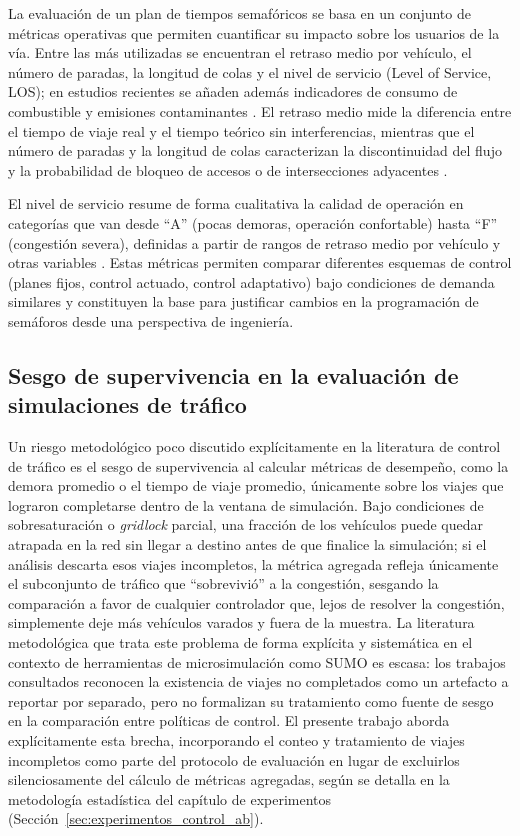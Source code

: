 La evaluación de un plan de tiempos semafóricos se basa en un conjunto de métricas operativas que permiten cuantificar su impacto sobre los usuarios de la vía. Entre las más utilizadas se encuentran el retraso medio por vehículo, el número de paradas, la longitud de colas y el nivel de servicio (Level of Service, LOS); en estudios recientes se añaden además indicadores de consumo de combustible y emisiones contaminantes \cite{garber2019traffic,roess2019traffic,papageorgiou2003review}. El retraso medio mide la diferencia entre el tiempo de viaje real y el tiempo teórico sin interferencias, mientras que el número de paradas y la longitud de colas caracterizan la discontinuidad del flujo y la probabilidad de bloqueo de accesos o de intersecciones adyacentes \cite{garber2019traffic,fhwa2008signal}.

El nivel de servicio resume de forma cualitativa la calidad de operación en categorías que van desde ``A'' (pocas demoras, operación confortable) hasta ``F'' (congestión severa), definidas a partir de rangos de retraso medio por vehículo y otras variables \cite{roess2019traffic,fhwa2008signal}. Estas métricas permiten comparar diferentes esquemas de control (planes fijos, control actuado, control adaptativo) bajo condiciones de demanda similares y constituyen la base para justificar cambios en la programación de semáforos desde una perspectiva de ingeniería.

\subsection{Sesgo de supervivencia en la evaluación de simulaciones de tráfico}
\label{subsec:sesgo_supervivencia}

Un riesgo metodológico poco discutido explícitamente en la literatura de control de tráfico es el sesgo de supervivencia al calcular métricas de desempeño, como la demora promedio o el tiempo de viaje promedio, únicamente sobre los viajes que lograron completarse dentro de la ventana de simulación. Bajo condiciones de sobresaturación o \emph{gridlock} parcial, una fracción de los vehículos puede quedar atrapada en la red sin llegar a destino antes de que finalice la simulación; si el análisis descarta esos viajes incompletos, la métrica agregada refleja únicamente el subconjunto de tráfico que ``sobrevivió'' a la congestión, sesgando la comparación a favor de cualquier controlador que, lejos de resolver la congestión, simplemente deje más vehículos varados y fuera de la muestra. La literatura metodológica que trata este problema de forma explícita y sistemática en el contexto de herramientas de microsimulación como SUMO \cite{lopez2018microscopic} es escasa: los trabajos consultados reconocen la existencia de viajes no completados como un artefacto a reportar por separado, pero no formalizan su tratamiento como fuente de sesgo en la comparación entre políticas de control. El presente trabajo aborda explícitamente esta brecha, incorporando el conteo y tratamiento de viajes incompletos como parte del protocolo de evaluación en lugar de excluirlos silenciosamente del cálculo de métricas agregadas, según se detalla en la metodología estadística del capítulo de experimentos (Sección~\ref{sec:experimentos_control_ab}).

